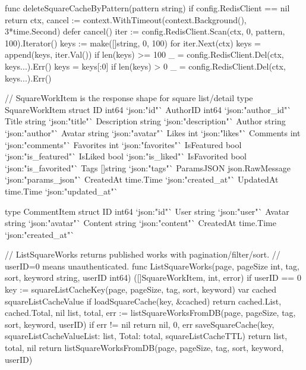 \documentclass[twoside]{thesis-cls-Miya} %
\begin{document}
func deleteSquareCacheByPattern(pattern string) {
	if config.RedisClient == nil {
		return
	}
	ctx, cancel := context.WithTimeout(context.Background(), 3*time.Second)
	defer cancel()
	iter := config.RedisClient.Scan(ctx, 0, pattern, 100).Iterator()
	keys := make([]string, 0, 100)
	for iter.Next(ctx) {
		keys = append(keys, iter.Val())
		if len(keys) >= 100 {
			_ = config.RedisClient.Del(ctx, keys...).Err()
			keys = keys[:0]
		}
	}
	if len(keys) > 0 {
		_ = config.RedisClient.Del(ctx, keys...).Err()
	}
}

// SquareWorkItem is the response shape for square list/detail
type SquareWorkItem struct {
	ID          int64           `json:"id"`
	AuthorID    int64           `json:"author_id"`
	Title       string          `json:"title"`
	Description string          `json:"description"`
	Author      string          `json:"author"`
	Avatar      string          `json:"avatar"`
	Likes       int             `json:"likes"`
	Comments    int             `json:"comments"`
	Favorites   int             `json:"favorites"`
	IsFeatured  bool            `json:"is_featured"`
	IsLiked     bool            `json:"is_liked"`
	IsFavorited bool            `json:"is_favorited"`
	Tags        []string        `json:"tags"`
	ParamsJSON  json.RawMessage `json:"params_json"`
	CreatedAt   time.Time       `json:"created_at"`
	UpdatedAt   time.Time       `json:"updated_at"`
}

type CommentItem struct {
	ID        int64     `json:"id"`
	User      string    `json:"user"`
	Avatar    string    `json:"avatar"`
	Content   string    `json:"content"`
	CreatedAt time.Time `json:"created_at"`
}

// ListSquareWorks returns published works with pagination/filter/sort.
// userID=0 means unauthenticated.
func ListSquareWorks(page, pageSize int, tag, sort, keyword string, userID int64) ([]SquareWorkItem, int, error) {
	if userID == 0 {
		key := squareListCacheKey(page, pageSize, tag, sort, keyword)
		var cached squareListCacheValue
		if loadSquareCache(key, &cached) {
			return cached.List, cached.Total, nil
		}
		list, total, err := listSquareWorksFromDB(page, pageSize, tag, sort, keyword, userID)
		if err != nil {
			return nil, 0, err
		}
		saveSquareCache(key, squareListCacheValue{List: list, Total: total}, squareListCacheTTL)
		return list, total, nil
	}
	return listSquareWorksFromDB(page, pageSize, tag, sort, keyword, userID)
}
\end{document}
